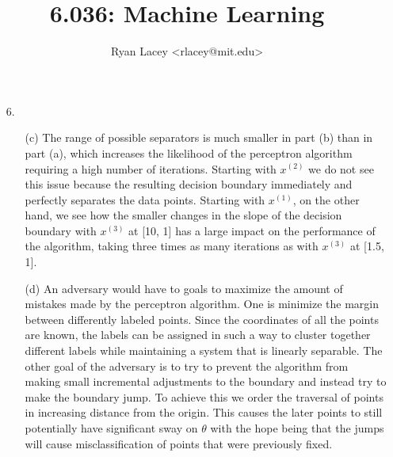 \documentclass{article}
\begin{document}

\title{6.036: Machine Learning}
\author{
  Ryan Lacey <rlacey@mit.edu>\\
}
        
\maketitle
        


\begin{enumerate}
\item[6.]
	\begin{enumerate}
	\item[(c)] 
		        The range of possible separators is much smaller in part (b) than in part (a), which increases the likelihood of the perceptron algorithm requiring a high number of iterations. Starting with $x^{(2)}$ we do not see this issue because the resulting decision boundary immediately and perfectly separates the data points. Starting with $x^{(1)}$, on the other hand, we see how the smaller changes in the slope of the decision boundary with $x^{(3)}$ at [10, 1] has a large impact on the performance of the algorithm, taking three times as many iterations as with $x^{(3)}$ at [1.5, 1].
	\item[(d)] 
		        An adversary would have to goals to maximize the amount of mistakes made by the perceptron algorithm. One is minimize the margin between differently labeled points. Since the coordinates of all the points are known, the labels can be assigned in such a way to cluster together different labels while maintaining a system that is linearly separable. The other goal of the adversary is to try to prevent the algorithm from making small incremental adjustments to the boundary and instead try to make the boundary jump. To achieve this we order the traversal of points in increasing distance from the origin. This causes the later points to still potentially have significant sway on $\theta$ with the hope being that the jumps will cause misclassification of points that were previously fixed.
	\end{enumerate}

\bigskip


\end{enumerate}
\end{document}
